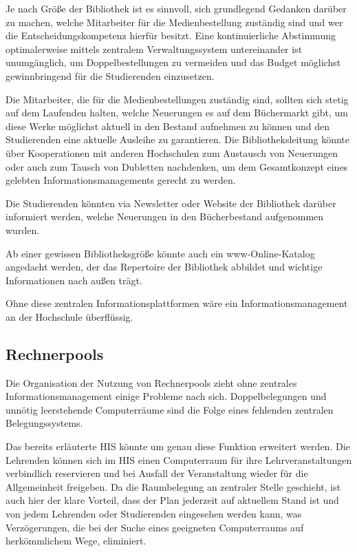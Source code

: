 Je nach Größe der Bibliothek ist es sinnvoll, sich grundlegend Gedanken darüber zu machen, 
welche Mitarbeiter für die Medienbestellung zuständig sind und wer die 
Entscheidungskompetenz hierfür besitzt. Eine kontinuierliche Abstimmung optimalerweise 
mittels zentralem Verwaltungssystem untereinander ist unumgänglich, um 
Doppelbestellungen zu vermeiden und das Budget möglichst gewinnbringend für die 
Studierenden einzusetzen. 

Die Mitarbeiter, die für die Medienbestellungen zuständig sind, sollten sich stetig auf dem 
Laufenden halten, welche Neuerungen es auf dem Büchermarkt gibt, um diese Werke 
möglichst aktuell in den Bestand aufnehmen zu können und den Studierenden eine aktuelle 
Ausleihe zu garantieren. Die Bibliotheksleitung könnte über Kooperationen mit anderen 
Hochschulen zum Austausch von Neuerungen oder auch zum Tausch von Dubletten 
nachdenken, um dem Gesamtkonzept eines gelebten Informationsmanagements gerecht zu 
werden. 

Die Studierenden könnten via Newsletter oder Website der Bibliothek darüber informiert werden, welche Neuerungen in den Bücherbestand aufgenommen wurden. 

Ab einer gewissen Bibliotheksgröße könnte auch ein www-Online-Katalog angedacht werden, der das Repertoire der Bibliothek abbildet und wichtige Informationen nach außen trägt.

Ohne diese zentralen Informationsplattformen wäre ein Informationsmanagement an der Hochschule überflüssig.


\subsection{Rechnerpools}
Die Organisation der Nutzung von Rechnerpools zieht ohne zentrales 
Informationsmanagement einige Probleme nach sich. Doppelbelegungen und unnötig 
leerstehende Computerräume sind die Folge eines fehlenden zentralen Belegungssystems.

Das bereits erläuterte HIS könnte um genau diese Funktion erweitert werden. Die Lehrenden 
können sich im HIS einen Computerraum für ihre Lehrveranstaltungen verbindlich 
reservieren und bei Ausfall der Veranstaltung wieder für die Allgemeinheit freigeben. Da die 
Raumbelegung an zentraler Stelle geschieht, ist auch hier der klare Vorteil, dass der Plan 
jederzeit auf aktuellem Stand ist und von jedem Lehrenden oder Studierenden eingesehen 
werden kann, was Verzögerungen, die bei der Suche eines geeigneten Computerraums auf 
herkömmlichem Wege, eliminiert. 
